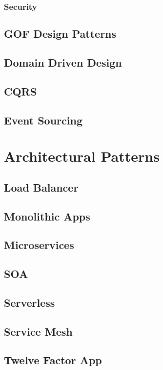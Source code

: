 \documentclass[a4paper]{article}
\begin{document}
    \subsubsection{Security}

    \subsection{GOF Design Patterns}
    \subsection{Domain Driven Design}
    \subsection{CQRS}
    \subsection{Event Sourcing}

    \newpage
    \section{Architectural Patterns}
    \subsection{Load Balancer}
    \subsection{Monolithic Apps}
    \subsection{Microservices}
    \subsection{SOA}
    \subsection{Serverless}
    \subsection{Service Mesh}
    \subsection{Twelve Factor App}
\end{document}
